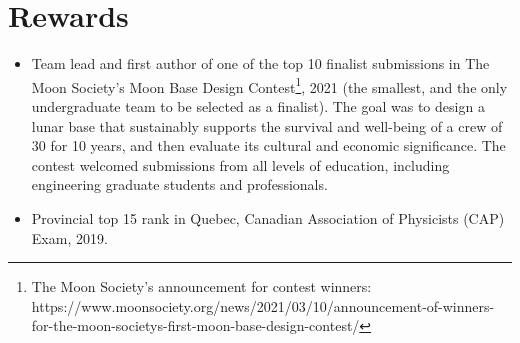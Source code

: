 \documentclass{article}
\newcommand{\cvsection}[1]{\section*{\rmfamily#1}}
\begin{document}
\cvsection{Rewards}
\begin{itemize}
    \item Team lead and first author of one of the top 10 finalist submissions in The Moon Society's Moon Base Design Contest\footnote[4]{The Moon Society's announcement for contest winners: https://www.moonsociety.org/news/2021/03/10/announcement-of-winners-for-the-moon-societys-first-moon-base-design-contest/}, 2021 (the smallest, and the only undergraduate team to be selected as a finalist). The goal was to design a lunar base that sustainably supports the survival and well-being of a crew of 30 for 10 years, and then evaluate its cultural and economic significance. The contest welcomed submissions from all levels of education, including engineering graduate students and professionals.
    \item Provincial top 15 rank in Quebec, Canadian Association of Physicists (CAP) Exam, 2019.
\end{itemize}
\end{document}
